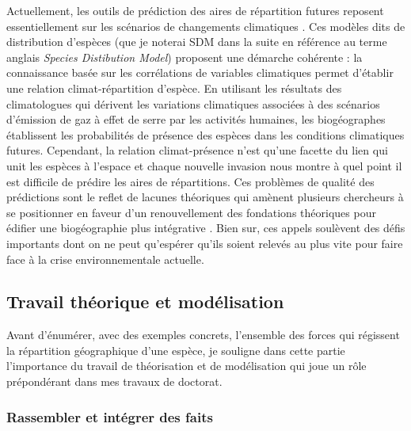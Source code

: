 Actuellement, les outils de prédiction des aires de répartition futures
reposent essentiellement sur les scénarios de changements climatiques
\citep{Peterson2011}. Ces modèles dits de distribution d'espèces (que je
noterai SDM dans la suite en référence au terme anglais \emph{Species
Distibution Model}) proposent une démarche cohérente : la connaissance
basée sur les corrélations de variables climatiques permet d'établir une
relation climat-répartition d'espèce. En utilisant les résultats des
climatologues qui dérivent les variations climatiques associées à des
scénarios d'émission de gaz à effet de serre par les activités humaines,
les biogéographes établissent les probabilités de présence des espèces
dans les conditions climatiques futures. Cependant, la relation
climat-présence n'est qu'une facette du lien qui unit les espèces à
l'espace et chaque nouvelle invasion nous montre à quel point il est
difficile de prédire les aires de répartitions. Ces problèmes de qualité
des prédictions sont le reflet de lacunes théoriques qui amènent
plusieurs chercheurs à se positionner en faveur d'un renouvellement des
fondations théoriques pour édifier une biogéographie plus intégrative
\citep{Lomolino2000, Beck2012, Thuiller2013}. Bien sur, ces appels
soulèvent des défis importants dont on ne peut qu'espérer qu'ils soient
relevés au plus vite pour faire face à la crise environnementale
actuelle.

\subsection*{Travail théorique et
modélisation}\label{travail-thuxe9orique-et-moduxe9lisation}

Avant d'énumérer, avec des exemples concrets, l'ensemble des forces qui
régissent la répartition géographique d'une espèce, je souligne dans
cette partie l'importance du travail de théorisation et de modélisation
qui joue un rôle prépondérant dans mes travaux de doctorat.

\subsubsection*{Rassembler et intégrer des
faits}\label{rassembler-et-intuxe9grer-des-faits}

